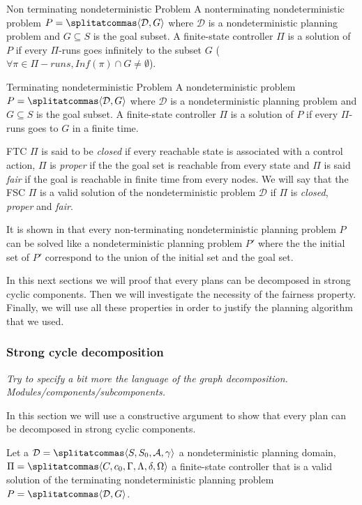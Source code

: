 \begin{nameddef}{Non terminating nondeterministic Problem}
A nonterminating nondeterministic problem $P = \planningproblem$ where $\mathcal{D}$ is a nondeterministic planning problem and $G \subseteq S$ is the goal subset. A finite-state controller $\Pi$ is a solution of $P$ if every $\Pi$-runs goes infinitely to the subset $G$ ($\forall \pi \in \Pi-runs, Inf(\pi) \cap G \neq \emptyset$).
\end{nameddef}

\begin{nameddef}{Terminating nondeterministic Problem}
A nondeterministic problem $P = \planningproblem$ where $\mathcal{D}$ is a nondeterministic planning problem and $G \subseteq S$ is the goal subset. A finite-state controller $\Pi$ is a solution of $P$ if every $\Pi$-runs goes to $G$ in a finite time.
\end{nameddef}

FTC $\Pi$ is said to be \textit{closed} if every reachable state is associated with a control  action, $\Pi$ is \textit{proper} if the the goal set is reachable from every state and $\Pi$ is said \textit{fair} if the goal is reachable in finite time from every nodes.
We will say that the FSC $\Pi$ is a valid solution of the nondeterministic problem $\mathcal{D}$ if $\Pi$ is \textit{closed}, \textit{proper} and \textit{fair}.

It is shown in \cite{patrizi2013fair} that every non-terminating nondeterministic planning problem $P$ can be solved like a nondeterministic planning problem $P'$ where the the initial set of $P'$ correspond to the union of the initial set and the goal set.

In this next sections we will proof that every plans can be decomposed in strong cyclic components.
Then we will investigate the necessity of the fairness property.
Finally, we will use all these properties in order to justify the planning algorithm that we used.

\subsubsection{Strong cycle decomposition}
\textit{Try to specify a bit more the language of the graph decomposition.
Modules/components/subcomponents.}

In this section we will use a constructive argument to show that every plan can be decomposed in strong cyclic components.

Let a $\mathcal{D} = \planningdomain$ a nondeterministic planning domain, $\Pi = \controller$ a finite-state controller that is a valid solution of the terminating nondeterministic planning problem $P = \planningproblem$.

